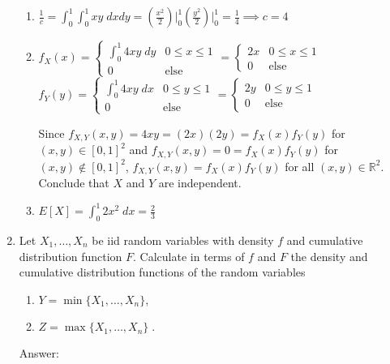 \documentclass{article}
\begin{document}
\begin{enumerate}
\begin{enumerate}
\item
$
\frac{1}{c} = \int_0^1 \int_0^1 xy \; dx dy = \left(\frac{x^2}{2}\right)\biggr\vert_0^1
\left(\frac{y^2}{2}\right)\biggr\vert_0^1
= \frac{1}{4}
\implies \boxed{c = 4}
$
\item
$
f_X(x) = 
\begin{cases}
\int_0^1 4xy \; dy & 0 \leq x \leq 1 \\
0 & \text{else}
\end{cases}
=
\begin{cases}
2x & 0 \leq x \leq 1 \\
0 & \text{else}
\end{cases}
$\\
$
f_Y(y) = 
\begin{cases}
\int_0^1 4xy \; dx & 0 \leq y \leq 1 \\
0 & \text{else}
\end{cases}
=
\begin{cases}
2y & 0 \leq y \leq 1 \\
0 & \text{else}
\end{cases}
$

Since $f_{X,Y}(x,y) = 4xy = (2x)(2y) = f_X(x)f_Y(y)$ for $(x,y) \in [0,1]^2$ and $f_{X,Y}(x,y) = 0 = f_X(x)f_Y(y)$ for $(x,y) \notin [0,1]^2$, $f_{X,Y}(x,y) = f_X(x)f_Y(y)$ for all $(x,y) \in \mathbb{R}^2$. Conclude that $X$ and $Y$ are independent. 

\item
$E[X] = \int_0^1 2x^2 \; dx = \frac{2}{3}$
\end{enumerate}

\item
Let $X_1, \dots ,X_n$ be iid random variables with
density $f$ and cumulative distribution function $F$. Calculate in terms of $f$ and $F$ the density and cumulative distribution functions of the random variables
\begin{enumerate}
\item
$Y = \min\{X_1,\dots, X_n\}$,

\item
$Z = \max\{X_1,\dots , X_n\} \;.$
\end{enumerate}

Answer:


\end{enumerate}
\end{document}
